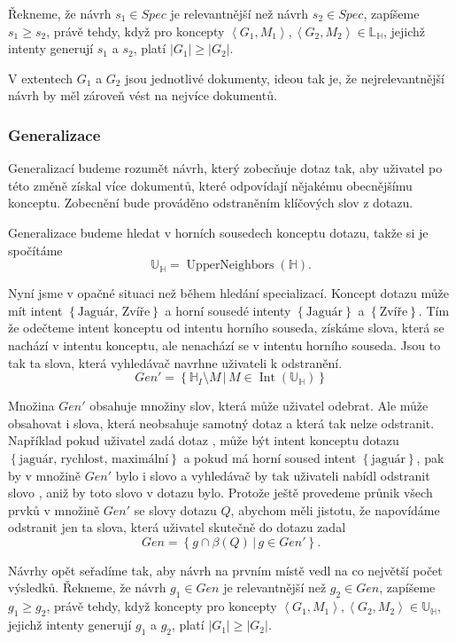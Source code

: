 \documentclass[12pt]{article}
\newcommand{\sep}{\,|\,}
\newcommand{\sssection}[1]{\subsubsection{#1}}
\newcommand{\adds}[1]{\left\{#1\right\}}
\newcommand{\addsp}[1]{\left<#1\right>}
\DeclareMathOperator{\intfca}{Int}
\DeclareMathOperator{\upperneighbors}{UpperNeighbors}
\newcommand{\hledany}{\mathbb{H}}
\newcommand{\lowerc}{\mathbb{L}}
\newcommand{\upperc}{\mathbb{U}}
\begin{document}
Řekneme, že návrh $s_1 \in Spec$ je relevantnější než návrh $s_2 \in Spec$, zapíšeme $s_1 \ge s_2$, právě tehdy, když pro koncepty $\addsp{G_1, M_1}, \addsp{G_2, M_2} \in \lowerc_\hledany$, jejichž intenty generují $s_1$ a $s_2$, platí $|G_1|\ge|G_2|$. 

V extentech $G_1$ a $G_2$ jsou jednotlivé dokumenty, ideou tak je, že nejrelevantnější návrh by měl zároveň vést na nejvíce dokumentů. 

\sssection{Generalizace}
Generalizací budeme rozumět návrh, který zobecňuje dotaz tak, aby uživatel po této změně získal více dokumentů, které odpovídají nějakému obecnějšímu konceptu. Zobecnění bude prováděno odstraněním klíčových slov z dotazu. 

Generalizace budeme hledat v horních sousedech konceptu dotazu, takže si je spočítáme
$$
\upperc_\hledany=\upperneighbors(\hledany).
$$

Nyní jsme v opačné situaci než během hledání specializací. Koncept dotazu může mít intent $\adds{\mbox{Jaguár, Zvíře}}$ a horní sousedé intenty $\adds{\mbox{Jaguár}}$ a $\adds{\mbox{Zvíře}}$. Tím že odečteme intent konceptu od intentu horního souseda, získáme slova, která se nachází v intentu konceptu, ale nenachází se v intentu horního souseda. Jsou to tak ta slova, která vyhledávač navrhne uživateli k odstranění. 
$$
Gen'=\adds{\hledany_I\setminus M\sep M\in\intfca(\upperc_\hledany)}
$$

Množina $Gen'$ obsahuje množiny slov, která může uživatel odebrat. Ale může obsahovat i slova, která neobsahuje samotný dotaz a která tak nelze odstranit. Například pokud uživatel zadá dotaz , může být intent konceptu dotazu $\adds{\mbox{jaguár, rychlost, maximální}}$ a pokud má horní soused intent $\adds{\mbox{jaguár}}$, pak by v množině $Gen'$ bylo i slovo  a vyhledávač by tak uživateli nabídl odstranit slovo , aniž by toto slovo v dotazu bylo. Protože ještě provedeme průnik všech prvků v množině $Gen'$ se slovy dotazu $Q$, abychom měli jistotu, že napovídáme odstranit jen ta slova, která uživatel skutečně do dotazu zadal
$$
Gen=\adds{g\cap\beta(Q)\sep g\in Gen'}.
$$

Návrhy opět seřadíme tak, aby návrh na prvním místě vedl na co největší počet výsledků. Řekneme, že návrh $g_1\in Gen$ je relevantnější než $g_2\in Gen$, zapíšeme $g_1\ge g_2$, právě tehdy, když koncepty pro koncepty $\addsp{G_1, M_1}, \addsp{G_2, M_2} \in \upperc_\hledany$, jejichž intenty generují $g_1$ a $g_2$, platí $|G_1|\ge|G_2|$. 
\end{document}
